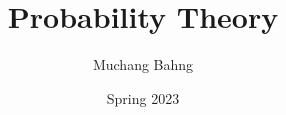 \documentclass{article}
\newcounter{theorem}[section]
\begin{document}
\title{Probability Theory}
\author{Muchang Bahng}
\date{Spring 2023}

\maketitle
\tableofcontents
\pagebreak








\end{document}
